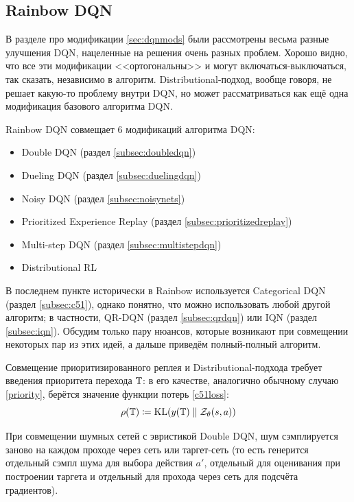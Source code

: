 \subsection{Rainbow DQN}\label{subsec:rainbow}

В разделе про модификации \ref{sec:dqnmods} были рассмотрены весьма разные улучшения DQN, нацеленные на решения очень разных проблем. Хорошо видно, что все эти модификации <<ортогональны>> и могут включаться-выключаться, так сказать, независимо в алгоритм. Distributional-подход, вообще говоря, не решает какую-то проблему внутри DQN, но может рассматриваться как ещё одна модификация базового алгоритма DQN.

Rainbow DQN совмещает 6 модификаций алгоритма DQN:
\begin{itemize}
    \item Double DQN (раздел \ref{subsec:doubledqn})
    \item Dueling DQN (раздел \ref{subsec:duelingdqn})
    \item Noisy DQN  (раздел \ref{subsec:noisynets})
    \item Prioritized Experience Replay (раздел \ref{subsec:prioritizedreplay})
    \item Multi-step DQN (раздел \ref{subsec:multistepdqn})
    \item Distributional RL
\end{itemize}

В последнем пункте исторически в Rainbow используется Categorical DQN (раздел \ref{subsec:c51}), однако понятно, что можно использовать любой другой алгоритм; в частности, QR-DQN (раздел \ref{subsec:qrdqn}) или IQN (раздел \ref{subsec:iqn}). Обсудим только пару нюансов, которые возникают при совмещении некоторых пар из этих идей, а дальше приведём полный-полный алгоритм.

Совмещение приоритизированного реплея и Distributional-подхода требует введения приоритета перехода $\mathbb{T}$: в его качестве, аналогично обычному случаю \eqref{priority}, берётся значение функции потерь \eqref{c51loss}: 
$$\rho(\mathbb{T}) \coloneqq \operatorname{KL}(y(\mathbb{T}) \parallel \mathcal{Z}_{\theta}(s, a))$$

При совмещении шумных сетей с эвристикой Double DQN, шум сэмплируется заново на каждом проходе через сеть или таргет-сеть (то есть генерится отдельный сэмпл шума для выбора действия $a'$, отдельный для оценивания при построении таргета и отдельный для прохода через сеть для подсчёта градиентов).

